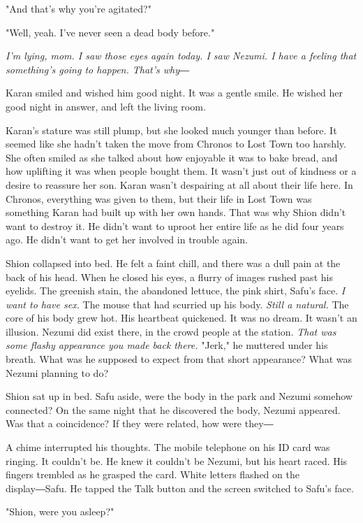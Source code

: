 "And that's why you're agitated?"

"Well, yeah. I've never seen a dead body before."

\emph{I'm lying, mom. I saw those eyes again today. I saw Nezumi. I have a
	feeling that something's going to happen. That's why―}

Karan smiled and wished him good night. It was a gentle smile. He wished
her good night in answer, and left the living room.

Karan's stature was still plump, but she looked much younger than
before. It seemed like she hadn't taken the move from Chronos to Lost
Town too harshly. She often smiled as she talked about how enjoyable it
was to bake bread, and how uplifting it was when people bought them. It
wasn't just out of kindness or a desire to reassure her son. Karan
wasn't despairing at all about their life here. In Chronos, everything
was given to them, but their life in Lost Town was something Karan had
built up with her own hands. That was why Shion didn't want to destroy
it. He didn't want to uproot her entire life as he did four years ago.
He didn't want to get her involved in trouble again.

Shion collapsed into bed. He felt a faint chill, and there was a dull
pain at the back of his head. When he closed his eyes, a flurry of
images rushed past his eyelids. The greenish stain, the abandoned
lettuce, the pink shirt, Safu's face. \emph{I want to have sex.} The mouse that
had scurried up his body. \emph{Still a natural.} The core of his body grew
hot. His heartbeat quickened. It was no dream. It wasn't an illusion.
Nezumi did exist there, in the crowd people at the station. \emph{That was
	some flashy appearance you made back there.} "Jerk," he muttered under
his breath. What was he supposed to expect from that short appearance?
What was Nezumi planning to do?

Shion sat up in bed. Safu aside, were the body in the park and Nezumi
somehow connected? On the same night that he discovered the body, Nezumi
appeared. Was that a coincidence? If they were related, how were they―

A chime interrupted his thoughts. The mobile telephone on his ID card
was ringing. It couldn't be. He knew it couldn't be Nezumi, but his
heart raced. His fingers trembled as he grasped the card. White letters
flashed on the display―Safu. He tapped the Talk button and the screen
switched to Safu's face.

"Shion, were you asleep?"

